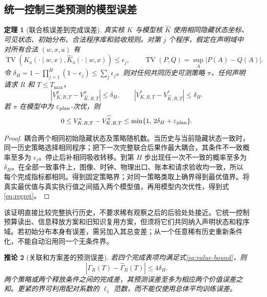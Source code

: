 \documentclass[11pt,a4paper,fontset=fandol]{ctexart}
\newtheorem{theorem}{定理}[section]
\newtheorem{corollary}[theorem]{推论}
\theoremstyle{definition}
\theoremstyle{remark}
\numberwithin{equation}{section}
\newcommand{\TV}{\operatorname{TV}}
\begin{document}
\subsection{统一控制三类预测的模型误差}
\begin{theorem}[联合核误差到完成误差]
\label{thm:uniform}
真实核 $K$ 与模型核 $\widehat K$ 使用相同隐藏状态坐标、可见状态、初始分布、合法程序库和验收规则。对第 $j$ 个程序，假定在声明域中对所有合法 $(w,x,a)$ 有
\begin{equation}
 \TV\!\left(K_a(\cdot\mid w,x),\widehat K_a(\cdot\mid w,x)\right)
 \le\epsilon_j,\qquad
 \TV(P,Q)=\sup_A|P(A)-Q(A)|.
 \label{eq:kernel-tv}
\end{equation}
令 $\delta_H=1-\prod_{j=1}^H(1-\epsilon_j)\le\sum_j\epsilon_j$。则对任何共同历史可测策略 $\pi$、任何声明请求 $R$ 和 $T\le T_{\max}$，
\begin{equation}
 |V_{K,R,T}^{\pi}-V_{\widehat K,R,T}^{\pi}|\le\delta_H,\qquad
 |V_{K,R,T}^{*}-V_{\widehat K,R,T}^{*}|\le\delta_H.
 \label{eq:value-bound}
\end{equation}
若 $\widehat\pi$ 在模型中为 $\varepsilon_{\rm plan}$-次优，则
\begin{equation}
 0\le V_{K,R,T}^{*}-V_{K,R,T}^{\widehat\pi}
 \le\min\{1,\,2\delta_H+\varepsilon_{\rm plan}\}.
 \label{eq:regret}
\end{equation}
\end{theorem}
\begin{proof}
耦合两个相同初始隐藏状态及策略随机数。当历史与当前隐藏状态一致时，同一历史策略选择相同程序；把下一次完整联合后果作最大耦合，其条件不一致概率至多为 $\epsilon_j$。停止后补相同吸收转移。到第 $H$ 步出现任一次不一致的概率至多为 $\delta_H$。在全部一致事件上，图像、时钟、物理出口、账本和请求验收均一致，所以每个完成指标都相同。得到固定策略界；对同一策略类取上确界得到最优值界。将真实最优值与真实执行值之间插入两个模型值，再用模型内次优性，得到式\eqref{eq:regret}。
\end{proof}

该证明直接比较完整执行历史，不要求稀有观察之后的后验处处接近。它统一控制预算读出、信息释放方案和旧知识复用方案，但须将它们共同纳入声明状态和程序域。若初始分布本身有误差，需另加入其总变差；从一个任意稀有历史重新条件化，不能自动沿用同一个无条件界。

\begin{corollary}[关联和方案差的预测误差]
\label{cor:gamma-error}
若四个完成表项均满足式\eqref{eq:value-bound}，则
\begin{equation}
 |\Gamma_R(T)-\widehat\Gamma_R(T)|\le4\delta_H.
\end{equation}
两个策略或两个释放条件之间的完成差，其预测误差至多为相应两个价值误差之和。更紧的界可利用配对系数的 $\ell_1$ 范数，而不能仅使用总体平均训练误差。
\end{corollary}
\end{document}
